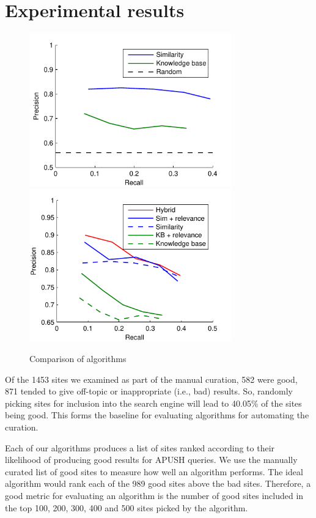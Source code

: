 \documentclass[pdfpagelabels=false,plainpages=true]{acm_proc_article-sp}
\begin{document}
\section{Experimental results}

\begin{figure}
\includegraphics[width=3.45in]{expt}
\includegraphics[width=3.45in]{expt_relevance}
\caption{Comparison of algorithms}
\label{fig-expt}
\end{figure}

Of the 1453 sites we examined as part of the manual curation, 582 were good, 871
tended to give off-topic or inappropriate (i.e., bad) results. So, randomly
picking sites for inclusion into the search engine will lead to 40.05\% of the
sites being good. This forms the baseline for evaluating algorithms for
automating the curation. 

Each of our algorithms produces a list of sites ranked according to their
likelihood of producing good results for APUSH queries. We use the manually
curated list of good sites to measure how well an algorithm performs. The ideal
algorithm would rank each of the 989 good sites above the bad sites. Therefore,
a good metric for evaluating an algorithm is the number of good sites included
in the top 100, 200, 300, 400 and 500 sites picked by the algorithm. 
\end{document}
